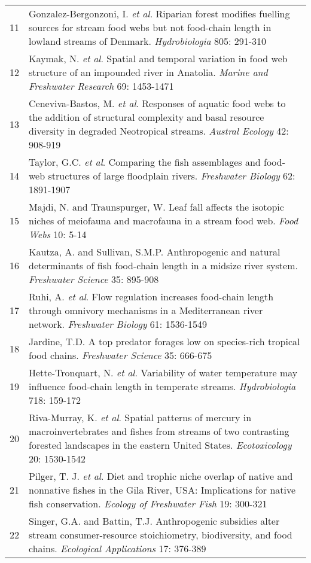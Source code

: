 \begin{longtable}{p{}p{}}
   11 & Gonzalez-Bergonzoni, I. \textit{et al}. Riparian forest modifies fuelling sources for stream food webs but not food-chain length in lowland streams of Denmark. \textit{Hydrobiologia} 805: 291-310 \\ 
   12 & Kaymak, N. \textit{et al}. Spatial and temporal variation in food web structure of an impounded river in Anatolia. \textit{Marine and Freshwater Research} 69: 1453-1471 \\ 
   13 & Ceneviva-Bastos, M. \textit{et al}. Responses of aquatic food webs to the addition of structural complexity and basal resource diversity in degraded Neotropical streams. \textit{Austral Ecology} 42: 908-919 \\ 
   14 & Taylor, G.C. \textit{et al}. Comparing the fish assemblages and food-web structures of large floodplain rivers. \textit{Freshwater Biology} 62: 1891-1907 \\ 
   15 & Majdi, N. and Traunspurger, W. Leaf fall affects the isotopic niches of meiofauna and macrofauna in a stream food web. \textit{Food Webs} 10: 5-14 \\ 
   16 & Kautza, A. and Sullivan, S.M.P. Anthropogenic and natural determinants of fish food-chain length in a midsize river system. \textit{Freshwater Science} 35: 895-908 \\ 
   17 & Ruhi, A. \textit{et al}. Flow regulation increases food-chain length through omnivory mechanisms in a Mediterranean river network. \textit{Freshwater Biology} 61: 1536-1549 \\ 
   18 & Jardine, T.D. A top predator forages low on species-rich tropical food chains. \textit{Freshwater Science} 35: 666-675 \\ 
   19 & Hette-Tronquart, N. \textit{et al}. Variability of water temperature may influence food-chain length in temperate streams. \textit{Hydrobiologia} 718: 159-172 \\ 
   20 & Riva-Murray, K. \textit{et al}. Spatial patterns of mercury in macroinvertebrates and fishes from streams of two contrasting forested landscapes in the eastern United States. \textit{Ecotoxicology} 20: 1530-1542 \\ 
   21 & Pilger, T. J. \textit{et al}. Diet and trophic niche overlap of native and nonnative fishes in the Gila River, USA: Implications for native fish conservation. \textit{Ecology of Freshwater Fish} 19: 300-321 \\ 
   22 & Singer, G.A. and Battin, T.J. Anthropogenic subsidies alter stream consumer-resource stoichiometry, biodiversity, and food chains. \textit{Ecological Applications} 17: 376-389 \\ 

\end{longtable}

